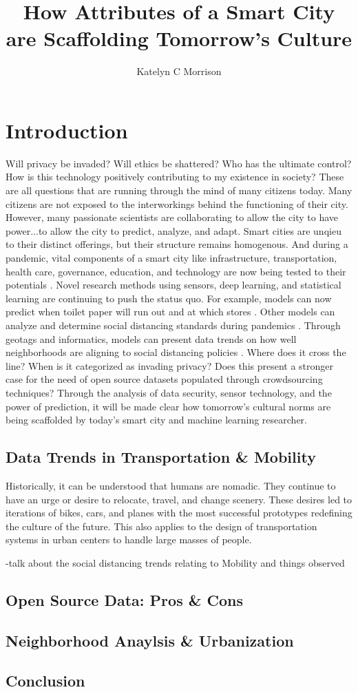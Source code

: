 \documentclass[12pt]{article}
\title{
    How Attributes of a Smart City are Scaffolding Tomorrow's Culture
}
\author{Katelyn C Morrison}
\begin{document}
\maketitle

\section*{Introduction}
Will privacy be invaded? Will ethics be shattered? Who has the ultimate control? How
is this technology positively contributing to my existence in society?
These are all questions that are running through the mind of many citizens today. 
Many citizens are not exposed to the interworkings behind the functioning of their city.
However, many passionate scientists are collaborating to allow the city to have power...to allow the city to predict, analyze, and adapt.
Smart cities are unqieu to their distinct offerings, but their structure remains homogenous. 
And during a pandemic, vital components of a smart city like infrastructure, transportation, 
health care, governance, education, and technology are now being tested to their potentials \cite{DefiningSmartCities}.
Novel research methods using sensors, deep learning, and statistical learning are continuing to push the status quo. 
For example, models can now predict
when toilet paper will run out and at which stores \cite{GotTP}. Other models can analyze and determine
social distancing standards during pandemics \cite{das_james_2020}. Through geotags and informatics,
models can present data trends on how well neighborhoods are aligning to social distancing policies \cite{gazette_2020}.
Where does it cross the line? When is it categorized as invading privacy? Does this present a
stronger case for the need of open source datasets populated through crowdsourcing techniques? 
Through the analysis of data security, 
sensor technology, and the power of prediction, it will be made clear how tomorrow's
cultural norms are being scaffolded by today's smart city and machine learning researcher.
\subsection*{Data Trends in Transportation \& Mobility}
Historically, it can be understood that humans are nomadic. They continue to have an urge or desire
to relocate, travel, and change scenery. These desires led to iterations of bikes, cars, and planes
with the most successful prototypes redefining the culture of the future. This also applies to the design 
of transportation systems in urban centers to handle large masses of people. 

-talk about the social distancing trends relating to Mobility and things observed

\subsection*{Open Source Data: Pros \& Cons}


\subsection*{Neighborhood Anaylsis \& Urbanization}

\subsection*{Conclusion}



\end{document}

